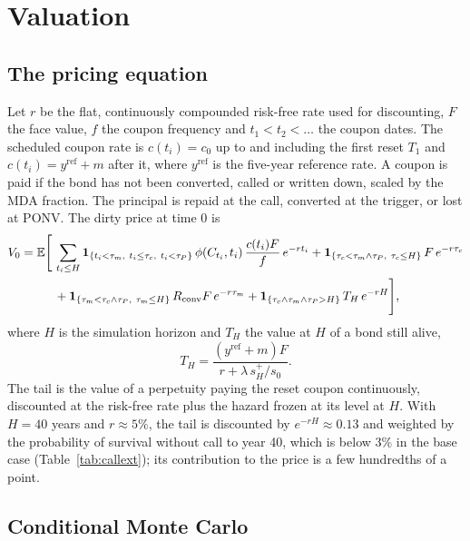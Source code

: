 \section{Valuation}\label{sec:valuation}

\subsection{The pricing equation}

Let $r$ be the flat, continuously compounded risk-free rate used for discounting, $F$ the
face value, $f$ the coupon frequency and $t_1<t_2<\dots$ the coupon dates. The scheduled
coupon rate is $c(t_i)=c_0$ up to and including the first reset $T_1$ and
$c(t_i)=y^{\mathrm{ref}}+m$ after it, where $y^{\mathrm{ref}}$ is the five-year reference
rate. A coupon is paid if the bond has not been converted, called or written down, scaled
by the MDA fraction. The principal is repaid at the call, converted at the trigger, or
lost at PONV. The dirty price at time 0 is
\begin{equation}\label{eq:price}
\begin{split}
  V_0=\E\Biggl[\,&\sum_{t_i\le H}\1_{\{t_i<\tau_m,\ t_i\le\tau_c,\ t_i<\tau_P\}}
  \,\phi(C_{t_i},t_i)\,\frac{c(t_i)F}{f}\,e^{-rt_i}
  + \1_{\{\tau_c<\tau_m\wedge\tau_P,\ \tau_c\le H\}}\,F\,e^{-r\tau_c}\\
  &+ \1_{\{\tau_m<\tau_c\wedge\tau_P,\ \tau_m\le H\}}\,R_{\mathrm{conv}}F\,e^{-r\tau_m}
  + \1_{\{\tau_c\wedge\tau_m\wedge\tau_P>H\}}\,T_H\,e^{-rH}\Biggr],
\end{split}
\end{equation}
where $H$ is the simulation horizon and $T_H$ the value at $H$ of a bond still alive,
\begin{equation}\label{eq:tail}
  T_H = \frac{(y^{\mathrm{ref}}+m)F}{r+\lambda\, s_H^+/s_0}.
\end{equation}
The tail is the value of a perpetuity paying the reset coupon continuously, discounted
at the risk-free rate plus the hazard frozen at its level at $H$. With $H=40$ years and
$r\approx5\%$, the tail is discounted by $e^{-rH}\approx0.13$ and weighted by the
probability of survival without call to year 40, which is below $3\%$ in the base case
(Table~\ref{tab:callext}); its contribution to the price is a few hundredths of a point.

\subsection{Conditional Monte Carlo}

